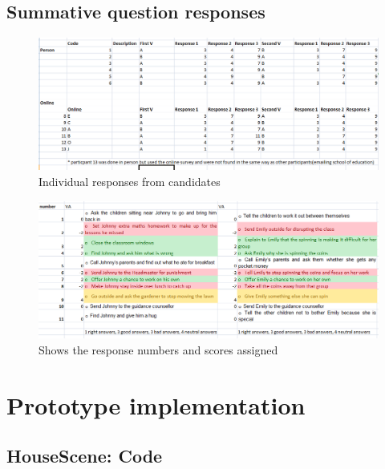 \section{Summative question responses}
\begin{figure}[H]
\centering
\includegraphics[scale=0.7]{images/appendix/summative_answers.png}
\caption{Individual responses from candidates}
\end{figure}

\begin{figure}[H]
\centering
\includegraphics[scale=0.7]{images/appendix/summative_responsescores.png}
\caption{Shows the response numbers and scores assigned}
\end{figure}



\chapter{Prototype implementation}

\section{HouseScene: Code}

